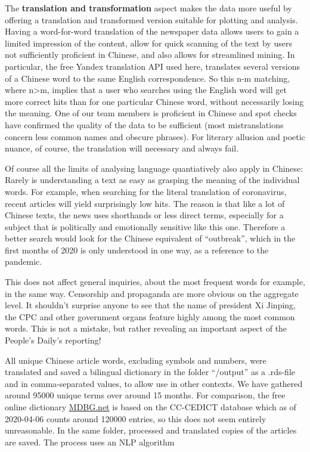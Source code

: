 \documentclass[12pt,a4paper]{article}
\begin{document}
The \textbf{translation and transformation} aspect makes the data more useful by offering a translation and transformed version suitable for plotting and analysis. Having a word-for-word translation of the newspaper data allows users to gain a limited impression of the content, allow for quick scanning of the text by users not sufficiently proficient in Chinese, and also allows for streamlined mining. In particular, the free Yandex translation API used here, translates several versions of a Chinese word to the same English correspondence. So this n-m matching, where n\textgreater m, implies that a user who searches using the English word will get more correct hits than for one particular Chinese word, without necessarily losing the meaning. One of our team members is proficient in Chinese and spot checks have confirmed the quality of the data to be sufficient (most mistranslations concern less common names and obscure phrases). For literary allusion and poetic nuance, of course, the translation will necessary and always fail.

Of course all the limits of analysing language quantiatively also apply in Chinese: Rarely is understanding a text as easy as grasping the meaning of the individual words. For example, when searching for the literal translation of coronavirus, recent articles will yield surprisingly low hits. The reason is that like a lot of Chinese texts, the news uses shorthands or less direct terms, especially for a subject that is politically and emotionally sensitive like this one. Therefore a better search would look for the Chinese equivalent of \enquote{outbreak}, which in the first months of 2020 is only understood in one way, as a reference to the pandemic.

This does not affect general inquiries, about the most frequent words for example, in the same way. Censorship and propaganda are more obvious on the aggregate level. It shouldn't surprise anyone to see that the name of president Xi Jinping, the CPC and other government organs feature highly among the most common words. This is not a mistake, but rather revealing an important aspect of the People's Daily's reporting!

All unique Chinese article words, excluding symbols and numbers, were translated and saved a bilingual dictionary in the folder \enquote{/output} as a .rds-file and in comma-separated values, to allow use in other contexts. We have gathered around 95000 unique terms over around 15 months. For comparison, the free online dictionary \href{https://www.mdbg.net/chinese/dictionary?page=cedict}{MDBG.net} is based on the CC-CEDICT database which as of 2020-04-06 counts around 120000 entries, so this does not seem entirely unreasonable. In the same folder, processed and translated copies of the articles are saved. The process uses an NLP algorithm
\end{document}
